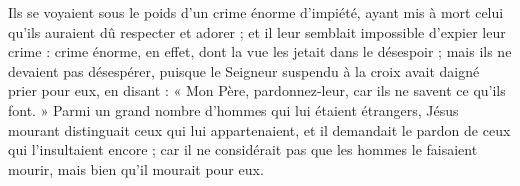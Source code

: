  Ils se voyaient sous le poids d’un crime énorme d’impiété, ayant mis à mort celui qu’ils auraient dû respecter et adorer ; et il leur semblait impossible d’expier leur crime : crime énorme, en effet, dont la vue les jetait dans le désespoir ; mais ils ne devaient pas désespérer, puisque le Seigneur suspendu à la croix avait daigné prier pour eux, en disant : « Mon Père, pardonnez-leur, car ils ne savent ce qu’ils font. » Parmi un grand nombre d’hommes qui lui étaient étrangers, Jésus mourant distinguait ceux qui lui appartenaient, et il demandait le pardon de ceux qui l’insultaient encore ; car il ne considérait pas que les hommes le faisaient mourir, mais bien qu’il mourait pour eux.